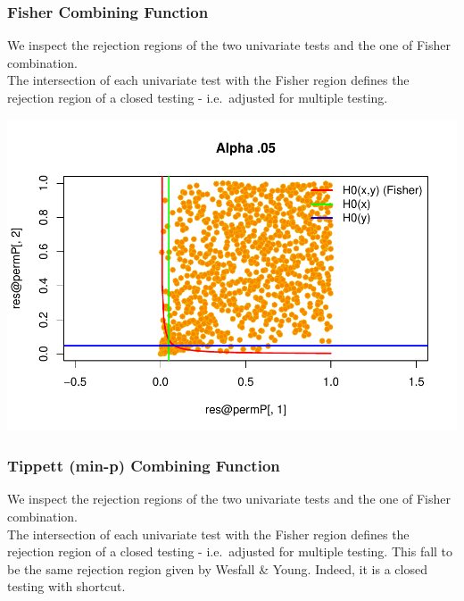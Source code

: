 \documentclass[
]{article}
\begin{document}
\hypertarget{fisher-combining-function}{%
\subsubsection{Fisher Combining
Function}\label{fisher-combining-function}}

We inspect the rejection regions of the two univariate tests and the one
of Fisher combination.\\
The intersection of each univariate test with the Fisher region defines
the rejection region of a closed testing - i.e.~adjusted for multiple
testing.

\begin{center}\includegraphics{perm_files/figure-latex/unnamed-chunk-40-1} \end{center}

\hypertarget{tippett-min-p-combining-function}{%
\subsubsection{Tippett (min-p) Combining
Function}\label{tippett-min-p-combining-function}}

We inspect the rejection regions of the two univariate tests and the one
of Fisher combination.\\
The intersection of each univariate test with the Fisher region defines
the rejection region of a closed testing - i.e.~adjusted for multiple
testing. This fall to be the same rejection region given by Wesfall \&
Young. Indeed, it is a closed testing with shortcut.
\end{document}
